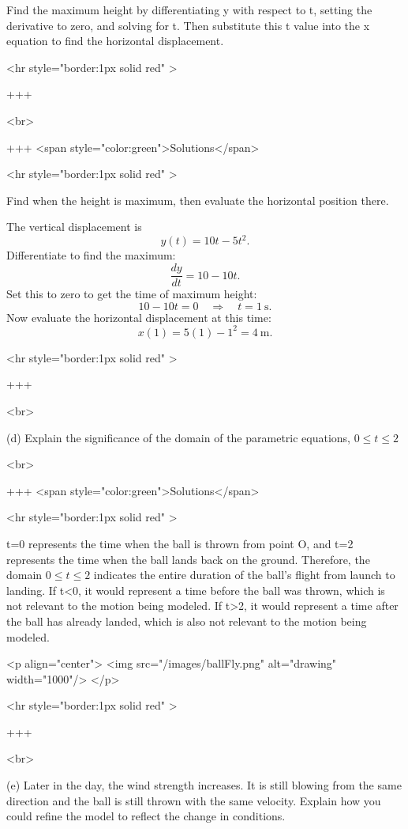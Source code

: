 Find the maximum height by differentiating y with respect to t, setting the derivative to zero, and solving for t. Then substitute this t value into the x equation to find the horizontal displacement.

<hr style="border:1px solid red" >

+++

<br>

+++ <span style="color:green">Solutions</span>

<hr style="border:1px solid red" >

Find when the height is maximum, then evaluate the horizontal position there.

The vertical displacement is
$$
y(t)=10t-5t^{2}.
$$
Differentiate to find the maximum:
$$
\frac{dy}{dt}=10-10t.
$$
Set this to zero to get the time of maximum height:
$$
10-10t=0 \quad\Rightarrow\quad t=1\ \text{s}.
$$
Now evaluate the horizontal displacement at this time:
$$
x(1)=5(1)-1^{2}=4\ \text{m}.
$$

<hr style="border:1px solid red" >

+++

<br>

(d) Explain the significance of the domain of the parametric equations, $0 \leq t \leq 2$

<br>

+++ <span style="color:green">Solutions</span>

<hr style="border:1px solid red" >

t=0 represents the time when the ball is thrown from point O, and t=2 represents the time when the ball lands back on the ground. Therefore, the domain $0 \leq t \leq 2$ indicates the entire duration of the ball's flight from launch to landing.
If t<0, it would represent a time before the ball was thrown, which is not relevant to the motion being modeled. If t>2, it would represent a time after the ball has already landed, which is also not relevant to the motion being modeled.

<p align="center">
<img src="/images/ballFly.png" alt="drawing" width="1000"/>
</p>

<hr style="border:1px solid red" >

+++

<br>

(e) Later in the day, the wind strength increases. It is still blowing from the same direction and the ball is still thrown with the same velocity. Explain how you could refine the model to reflect the change in conditions.

